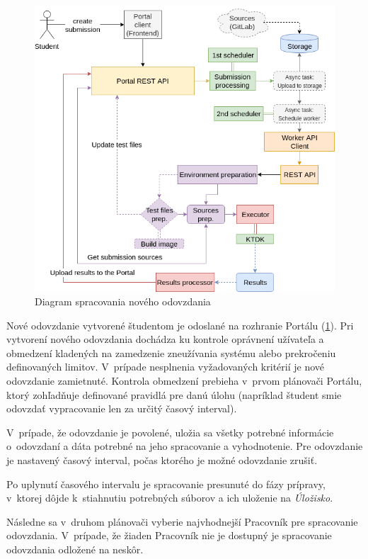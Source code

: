 \documentclass[
  digital, %
  oneside, %
  table,   %
  lof,     %
  lot,   %
]{fithesis3}
\begin{document}
\begin{figure}[!ht]
  \begin{center}
    \includegraphics[width=\textwidth]{imgs/create-subm.png}
  \end{center}
    \caption{Diagram spracovania nového odovzdania}
    \label{fig:create-subm}
\end{figure}


Nové odovzdanie vytvorené študentom je odoslané na rozhranie Portálu (\ref{fig:create-subm}). Pri vytvorení nového odovzdania dochádza ku kontrole oprávnení užívateľa a obmedzení kladených na zamedzenie zneužívania systému alebo prekročeniu definovaných limitov. V~prípade nesplnenia vyžadovaných kritérií je nové odovzdanie zamietnuté. Kontrola obmedzení prebieha v~prvom plánovači Portálu, ktorý zohľadňuje definované pravidlá pre danú úlohu (napríklad študent smie odovzdať vypracovanie len za určitý časový interval).

V~prípade, že odovzdanie je povolené, uložia sa všetky potrebné informácie o~odovzdaní a dáta potrebné na jeho spracovanie a vyhodnotenie. Pre odovzdanie je nastavený časový interval, počas ktorého je možné odovzdanie zrušiť.

Po uplynutí časového intervalu je spracovanie presunuté do fázy prípravy, v~ktorej dôjde k~stiahnutiu potrebných súborov a ich uloženie na \emph{Úložisko}.

Následne sa v~druhom plánovači vyberie najvhodnejší Pracovník pre spracovanie odovzdania. V~prípade, že žiaden Pracovník nie je dostupný je spracovanie odovzdania odložené na neskôr.
\end{document}
